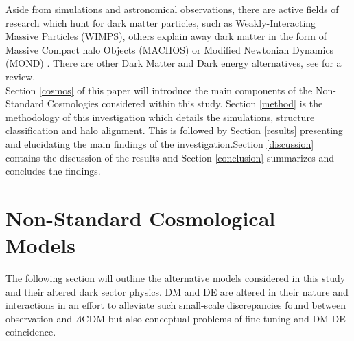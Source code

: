 \documentclass[a4paper,fleqn,usenatbib]{mnras}
\def \lcdm{$\Lambda$CDM }
\begin{document}
Aside from simulations and astronomical observations, there are active fields of research which hunt for dark matter particles, such as Weakly-Interacting Massive Particles (WIMPS)\citep{Cerde_10}, others explain away dark matter in the form of Massive Compact halo Objects (MACHOS) \citep{Alcock_00} or Modified Newtonian Dynamics (MOND) \citep{Milgrom_15}. There are other  Dark Matter and Dark energy alternatives, see \citet{Mannheim_06} for a review. 
\\
Section \ref{cosmos} of this paper will introduce the main components of the Non-Standard Cosmologies considered within this study. Section \ref{method} is the methodology of this investigation which details the simulations, structure classification and halo alignment. This is followed by Section \ref{results} presenting and elucidating the main findings of the investigation.Section \ref{discussion} contains the discussion of the results and Section \ref{conclusion} summarizes and concludes the findings. 
\begin{comment}
Observations of Supernovae type Ia are have been used as a standard candle to trace the nature and evolution of the universe. The FRW model of cosmology (derived from General Relativity for a perfect fluid, whereby the universe is assumed to be isotropic and homogeneous) is fit to these observations and it is found that \lcdm is an accurate cosmological model in that 1. the energy density resembles the critical density $\rho_{0}\approx 10^{-26}kg/m^{3}$ concluding a flat universe. 2. the matter energy density in the universe $\Omega_{M}^{flat}=0.28^{+0.09}_{-0.08}$ including dark matter 3. that the present accelerated expansion is owed to a cosmological constant $\Omega_{\Lambda}=0.7$, which recently (since z$\approx$0.37) became the dominant energy density of the universe. \citep{Riess_98,Perlmutter_99}
\end{comment}
\begin{comment}
According to linear theory and the Zel'dovich approximation \citep{Zeldovich_70} evolution of the cosmic web seemed to have begun from over-dense regions which collapsed along their shortest axes into sheets, then from sheets to filaments and finally into knots, totaling to make the cosmic web. But this large-scale collapse into these LSS provides the tidal field (also known as the bulk flow) unto which DM halos form and gain their initial spin . 
\end{comment}

\section{Non-Standard Cosmological Models}\label{nonstdcosmos}
The following section will outline the alternative models considered in this study and their altered dark sector physics. DM and DE are altered in their nature and interactions in an effort to alleviate such small-scale discrepancies found between observation and \lcdm but also conceptual problems of fine-tuning and DM-DE coincidence. 
\end{document}
